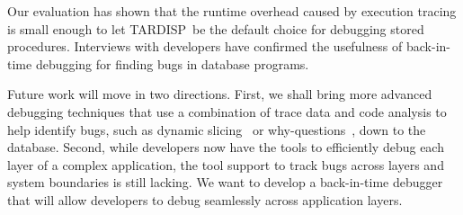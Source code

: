 \documentclass[english,conference]{IEEEtran}
\newcommand{\tool}{TAR\-DISP}
\begin{document}
Our evaluation has shown that the runtime overhead caused by execution tracing is small enough to let \tool\ be the default choice for debugging stored procedures.
Interviews with developers have confirmed the usefulness of back-in-time debugging for finding bugs in database programs.

Future work will move in two directions.
First, we shall bring more advanced debugging techniques that use a combination of trace data and code analysis to help identify bugs, such as dynamic slicing~\cite{agrawal_dynamic_1990} or why-questions~\cite{ko_debugging_2008}, down to the database.
Second, while developers now have the tools to efficiently debug each layer of a complex application, the tool support to track bugs across layers and system boundaries is still lacking.
We want to develop a back-in-time debugger that will allow developers to debug seamlessly across application layers.


%

\end{document}
